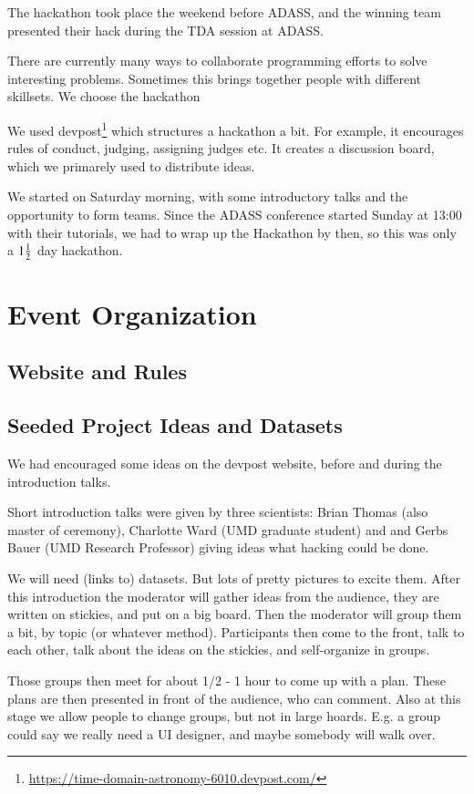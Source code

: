 \documentclass[11pt,twoside]{article}
\begin{document}
The hackathon took place the weekend before ADASS, and the winning team presented their hack during the TDA session at ADASS.

There are currently many ways to collaborate programming efforts to solve interesting problems.
Sometimes this brings together people with different skillsets. We choose the hackathon



We used devpost\footnote{\url{https://time-domain-astronomy-6010.devpost.com/}}
which structures a hackathon a bit. For example, it encourages rules of conduct,
judging, assigning judges etc.  It creates a discussion board, which we primarely used to
distribute ideas.

We started on Saturday morning, with some introductory talks and the opportunity to form teams.
Since the ADASS conference started Sunday at 13:00 with their tutorials, we had to wrap up
the Hackathon by then, so this was only a ${1 {1\over 2}}$ day hackathon.


\section{Event Organization}

\subsection*{Website and Rules}

\subsection*{Seeded Project Ideas and Datasets}
We had encouraged some ideas on the devpost website, before and during the introduction talks.

Short introduction talks were given by three scientists: Brian Thomas (also master of ceremony),
Charlotte Ward (UMD graduate student) and and Gerbs Bauer (UMD Research Professor)
giving ideas what hacking could be done. 

We will need (links to) datasets. But lots of pretty pictures to excite
them.  After this introduction the moderator will gather ideas
from the audience, they are written on stickies, and put on a big
board.  Then the moderator will group them a bit, by topic (or
whatever method).  Participants then come to the front, talk to each
other, talk about the ideas on the stickies, and self-organize in
groups.

Those groups then meet for about 1/2 - 1 hour to come up with a
plan. These plans are then presented in front of the audience, who can
comment.  Also at this stage we allow people to change groups, but not
in large hoards. E.g. a group could say we really need a UI designer,
and maybe somebody will walk over.
\end{document}
